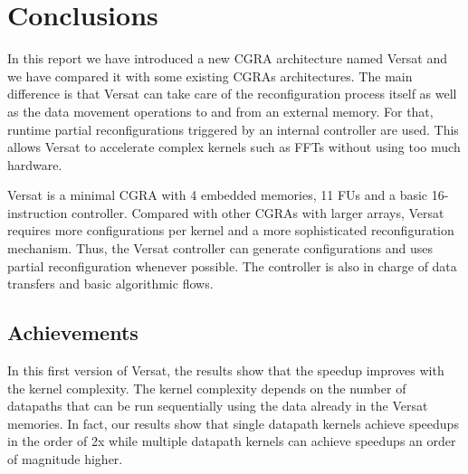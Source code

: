 
\chapter{Conclusions}
\label{chapter:conclusions}

In this report we have introduced a new CGRA architecture named Versat
and we have compared it with some existing CGRAs architectures. The
main difference is that Versat can take care of the reconfiguration
process itself as well as the data movement operations to and from an
external memory. For that, runtime partial reconfigurations triggered
by an internal controller are used. This allows Versat to accelerate
complex kernels such as FFTs without using too much hardware.

Versat is a minimal CGRA with 4 embedded memories, 11 FUs and a
basic 16-instruction controller. Compared with other CGRAs with larger
arrays, Versat requires more configurations per kernel and a more
sophisticated reconfiguration mechanism. Thus, the Versat controller
can generate configurations and uses partial reconfiguration whenever
possible. The controller is also in charge of data transfers and basic
algorithmic flows.




\section{Achievements}
\label{section:achievements}

In this first version of Versat, the results show that the speedup
improves with the kernel complexity. The kernel complexity depends on
the number of datapaths that can be run sequentially using the data
already in the Versat memories. In fact, our results show that single
datapath kernels achieve speedups in the order of 2x while multiple
datapath kernels can achieve speedups an order of magnitude higher.

